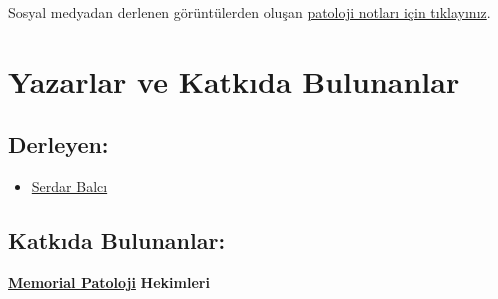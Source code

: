\documentclass[
  letterpaper,
  DIV=11,
  numbers=noendperiod]{scrreprt}
\providecommand{\tightlist}{%
  \setlength{\itemsep}{0pt}\setlength{\parskip}{0pt}}\usepackage{longtable,booktabs,array}
\begin{document}
Sosyal medyadan derlenen görüntülerden oluşan
\href{https://www.patolojinotlari.com/}{patoloji notları için
tıklayınız}.


\hypertarget{sec-yazarlar-katkida-bulunanlar}{%
\chapter*{Yazarlar ve Katkıda
Bulunanlar}\label{sec-yazarlar-katkida-bulunanlar}}


\hypertarget{sec-derleyen}{%
\section*{Derleyen:}\label{sec-derleyen}}


\begin{itemize}
\tightlist
\item
  \href{https://www.serdarbalci.com}{Serdar Balcı}
\end{itemize}

\hypertarget{sec-katkida-bulunanlar}{%
\section*{Katkıda Bulunanlar:}\label{sec-katkida-bulunanlar}}


\href{https://patoloji.memorial.com.tr/}{\textbf{Memorial Patoloji}}
\textbf{Hekimleri}
\end{document}

